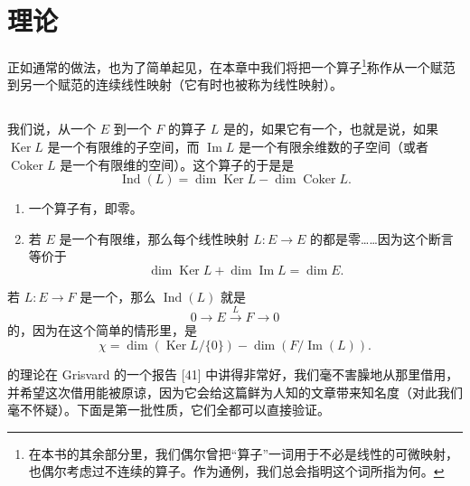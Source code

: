 
\section{\trFredholm{}理论}
\label{sec:appC-fredholm-theory}

正如通常的做法，也为了简单起见，在本章中我们将把一个算子\footnote{在本书的其余部分里，我们偶尔曾把“算子”一词用于不必是线性的可微映射，也偶尔考虑过不连续的算子。作为通例，我们总会指明这个词所指为何。}称作从一个赋范\trVectorSpace{}到另一个赋范\trVectorSpace{}的连续线性映射（它有时也被称为\trBounded{}线性映射）。

\subsection{\trFredholmOperator}
\label{subsec:appC-fredholm-operators}

我们说，从一个\trBanachSpace{} $E$ 到一个\trBanachSpace{} $F$ 的算子 $L$ 是\trFredholm{}的，如果它有一个\trIndex，也就是说，如果 $\operatorname{Ker} L$ 是一个有限维的子空间，而 $\operatorname{Im} L$ 是一个有限余维数的子空间（或者 $\operatorname{Coker} L$ 是一个有限维的空间）。这个算子的\trIndex{}于是是
\[
\operatorname{Ind}(L) = \dim \operatorname{Ker} L - \dim \operatorname{Coker} L.
\]

\begin{example}\label{thm:appC-fredholm-examples}
\begin{enumerate}[label=(\arabic*)]
\item 一个\trBijective{}算子有\trIndex，即零。
\item 若 $E$ 是一个有限维\trVectorSpace，那么每个线性映射 $L : E \to E$ 的\trIndex{}都是零……因为这个断言等价于
\[
\dim \operatorname{Ker} L + \dim \operatorname{Im} L = \dim E.
\]
\end{enumerate}
\end{example}

\begin{remark}\label{thm:appC-fredholm-euler-characteristic}
若 $L : E \to F$ 是一个\trFredholmOperator，那么 $\operatorname{Ind}(L)$ 就是\trChainComplex
\[
0 \longrightarrow E \xrightarrow{\ L\ } F \longrightarrow 0
\]
的\trEulerCharacteristic，因为在这个简单的情形里，\trEulerCharacteristic{}是
\[
\chi = \dim(\operatorname{Ker} L / \{0\}) - \dim(F / \operatorname{Im}(L)).
\]
\end{remark}

\trFredholmOperator{}的理论在 Grisvard 的一个报告 [41] 中讲得非常好，我们毫不害臊地从那里借用，并希望这次借用能被原谅，因为它会给这篇鲜为人知的文章带来知名度（对此我们毫不怀疑）。下面是第一批性质，它们全都可以直接验证。

